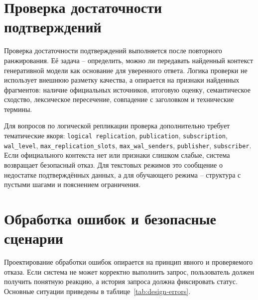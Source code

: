 \section{Проверка достаточности подтверждений}

Проверка достаточности подтверждений выполняется после повторного ранжирования. Её задача -- определить, можно ли передавать найденный контекст генеративной модели как основание для уверенного ответа. Логика проверки не использует внешнюю разметку качества, а опирается на признаки найденных фрагментов: наличие официальных источников, итоговую оценку, семантическое сходство, лексическое пересечение, совпадение с заголовком и технические термины.

Для вопросов по логической репликации проверка дополнительно требует тематические якоря: \texttt{logical replication}, \texttt{publication}, \texttt{subscription}, \texttt{wal\_level}, \texttt{max\_replication\_slots}, \texttt{max\_wal\_senders}, \texttt{publisher}, \texttt{subscriber}. Если официального контекста нет или признаки слишком слабые, система возвращает безопасный отказ. Для текстовых режимов это сообщение о недостатке подтверждённых данных, а для обучающего режима -- структура с пустыми шагами и пояснением ограничения.

\section{Обработка ошибок и безопасные сценарии}

Проектирование обработки ошибок опирается на принцип явного и проверяемого отказа. Если система не может корректно выполнить запрос, пользователь должен получить понятную реакцию, а история запроса должна фиксировать статус. Основные ситуации приведены в таблице~\ref{tab:design-errors}.

